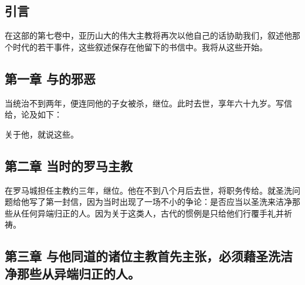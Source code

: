 
\subsection{引言}

在这部的第七卷中，亚历山大的伟大主教将再次以他自己的话协助我们，叙述他那个时代的若干事件，这些叙述保存在他留下的书信中。我将从这些开始。\par


\subsection{第一章 与的邪恶}

当统治不到两年，便连同他的子女被杀，继位。此时去世，享年六十九岁。写信给，论及如下：\par

 关于他，就说这些。\par


\subsection{第二章 当时的罗马主教}

在罗马城担任主教约三年，继位。他在不到八个月后去世，将职务传给。就圣洗问题给他写了第一封信，因为当时出现了一场不小的争论：是否应当以圣洗来洁净那些从任何异端归正的人。因为关于这类人，古代的惯例是只给他们行覆手礼并祈祷。\par


\subsection{第三章 与他同道的诸位主教首先主张，必须藉圣洗洁净那些从异端归正的人。}

